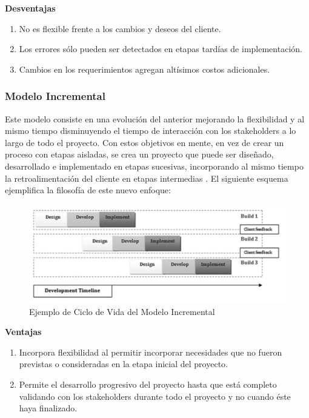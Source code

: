 \textbf{Desventajas}
\begin{enumerate}
  \item No es flexible frente a los cambios y deseos del cliente.
  \item Los errores sólo pueden ser detectados en etapas tardías de implementación.
  \item Cambios en los requerimientos agregan altísimos costos adicionales.
\end{enumerate}

\subsubsection{Modelo Incremental\label{sec:incremental_model}}

Este modelo consiste en una evolución del anterior mejorando la flexibilidad y al mismo tiempo disminuyendo  el tiempo de interacción con los stakeholders a lo largo de todo el proyecto. Con estos objetivos en mente, en vez de crear un proceso con etapas aisladas, se crea un proyecto que  puede ser diseñado, desarrollado e implementado en etapas sucesivas, incorporando al mismo tiempo la retroalimentación del cliente en etapas intermedias \cite{masssey}. El siguiente esquema ejemplifica la filosofía de este nuevo enfoque:

\begin{figure}[ht]
	\begin{center}
  \includegraphics[width=\textwidth]{./figures/chapter_02/02_example_of_incremental_lyfe_cicle.png}
  \caption{Ejemplo de Ciclo de Vida del Modelo Incremental}
  \label{fig:cascade_incremental_model}
	\end{center}
\end{figure}

\textbf{Ventajas}
\begin{enumerate}
  \item Incorpora flexibilidad al permitir incorporar necesidades que no fueron previstas o consideradas en la etapa inicial del proyecto.
  \item Permite el desarrollo progresivo del proyecto hasta que está completo validando con los stakeholders durante todo el proyecto y no cuando éste haya finalizado.
\end{enumerate}

